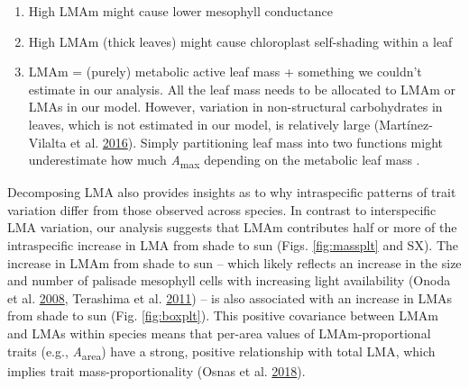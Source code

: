 \documentclass[
  12pt,
]{article}
\providecommand{\tightlist}{%
  \setlength{\itemsep}{0pt}\setlength{\parskip}{0pt}}
\begin{document}
\begin{enumerate}
\def\labelenumi{\arabic{enumi}.}
\tightlist
\item
  High LMAm might cause lower mesophyll conductance
\item
  High LMAm (thick leaves) might cause chloroplast self-shading within a leaf
\item
  LMAm = (purely) metabolic active leaf mass + something we couldn't estimate in our analysis. All the leaf mass needs to be allocated to LMAm or LMAs in our model. However, variation in non-structural carbohydrates in leaves, which is not estimated in our model, is relatively large (Martínez-Vilalta et al. \protect\hyperlink{ref-Martinez-Vilalta2016}{2016}). Simply partitioning leaf mass into two functions might underestimate how much \emph{A}\textsubscript{max} depending on the metabolic leaf mass .
\end{enumerate}

Decomposing LMA also provides insights as to why intraspecific patterns of trait variation differ from those observed across species.
In contrast to interspecific LMA variation, our analysis suggests that LMAm contributes half or more of the intraspecific increase in LMA from shade to sun (Figs. \ref{fig:massplt} and SX).
The increase in LMAm from shade to sun -- which likely reflects an increase in the size and number of palisade mesophyll cells with increasing light availability (Onoda et al. \protect\hyperlink{ref-Onoda2008}{2008}, Terashima et al. \protect\hyperlink{ref-Terashima2011}{2011}) -- is also associated with an increase in LMAs from shade to sun (Fig. \ref{fig:boxplt}).
This positive covariance between LMAm and LMAs within species means that per-area values of LMAm-proportional traits (e.g., \emph{A}\textsubscript{area}) have a strong, positive relationship with total LMA, which implies trait mass-proportionality (Osnas et al. \protect\hyperlink{ref-Osnas2018}{2018}).
\end{document}
